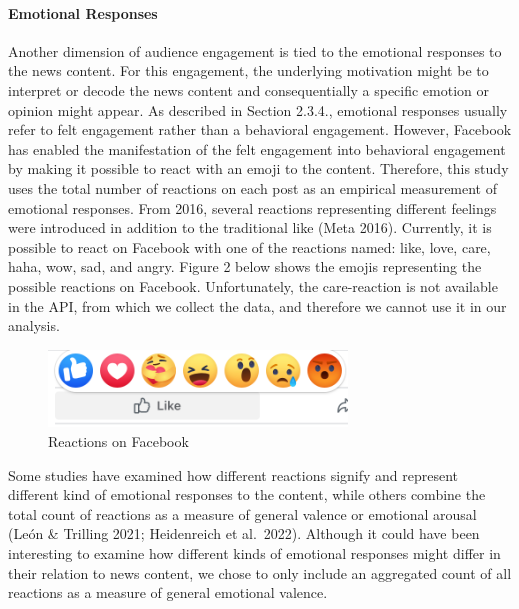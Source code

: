 \documentclass[
]{article}
\begin{document}
\hypertarget{emotional-responses-1}{%
\paragraph*{Emotional Responses}\label{emotional-responses-1}}

\hspace{-2.5em}

\noindent Another dimension of audience engagement is tied to the
emotional responses to the news content. For this engagement, the
underlying motivation might be to interpret or decode the news content
and consequentially a specific emotion or opinion might appear. As
described in Section 2.3.4., emotional responses usually refer to felt
engagement rather than a behavioral engagement. However, Facebook has
enabled the manifestation of the felt engagement into behavioral
engagement by making it possible to react with an emoji to the content.
Therefore, this study uses the total number of reactions on each post as
an empirical measurement of emotional responses. From 2016, several
reactions representing different feelings were introduced in addition to
the traditional like (Meta 2016). Currently, it is possible to react on
Facebook with one of the reactions named: like, love, care, haha, wow,
sad, and angry. Figure 2 below shows the emojis representing the
possible reactions on Facebook. Unfortunately, the care-reaction is not
available in the API, from which we collect the data, and therefore we
cannot use it in our analysis.

\begin{figure}[H]

{\centering \includegraphics[width=300px]{images/reactions_example} 

}

\caption{Reactions on Facebook}\label{fig:reactions_example}
\end{figure}

\noindent Some studies have examined how different reactions signify and
represent different kind of emotional responses to the content, while
others combine the total count of reactions as a measure of general
valence or emotional arousal (León \& Trilling 2021; Heidenreich et
al.~2022). Although it could have been interesting to examine how
different kinds of emotional responses might differ in their relation to
news content, we chose to only include an aggregated count of all
reactions as a measure of general emotional valence.
\end{document}
